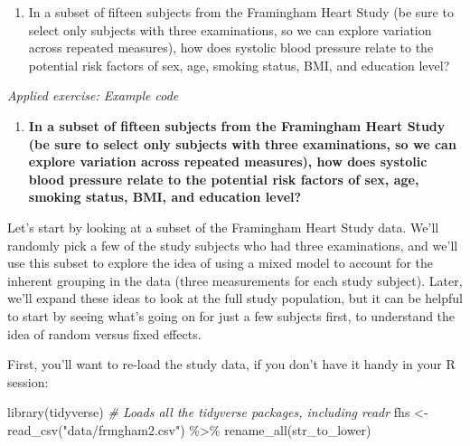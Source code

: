 \documentclass[
]{book}
\newenvironment{Shaded}{\begin{snugshade}}{\end{snugshade}}
\newcommand{\CommentTok}[1]{\textcolor[rgb]{0.56,0.35,0.01}{\textit{#1}}}
\newcommand{\FunctionTok}[1]{\textcolor[rgb]{0.00,0.00,0.00}{#1}}
\newcommand{\NormalTok}[1]{#1}
\newcommand{\OtherTok}[1]{\textcolor[rgb]{0.56,0.35,0.01}{#1}}
\newcommand{\SpecialCharTok}[1]{\textcolor[rgb]{0.00,0.00,0.00}{#1}}
\newcommand{\StringTok}[1]{\textcolor[rgb]{0.31,0.60,0.02}{#1}}
\providecommand{\tightlist}{%
  \setlength{\itemsep}{0pt}\setlength{\parskip}{0pt}}
\begin{document}
\begin{enumerate}
\def\labelenumi{\arabic{enumi}.}
\tightlist
\item
  In a subset of fifteen subjects from the Framingham Heart Study (be sure
  to select only subjects with three examinations, so we can explore variation
  across repeated measures), how does systolic blood pressure relate to the
  potential risk factors of sex, age, smoking status, BMI, and education level?
\end{enumerate}

\emph{Applied exercise: Example code}

\begin{enumerate}
\def\labelenumi{\arabic{enumi}.}
\tightlist
\item
  \textbf{In a subset of fifteen subjects from the Framingham Heart Study (be sure
  to select only subjects with three examinations, so we can explore variation
  across repeated measures), how does systolic blood pressure relate to the
  potential risk factors of sex, age, smoking status, BMI, and education level?}
\end{enumerate}

Let's start by looking at a subset of the Framingham Heart Study data. We'll
randomly pick a few of the study subjects who had three examinations, and
we'll use this subset to explore the idea of using a mixed model to account
for the inherent grouping in the data (three measurements for each study
subject). Later, we'll expand these ideas to look at the full study population,
but it can be helpful to start by seeing what's going on for just a few subjects
first, to understand the idea of random versus fixed effects.

First, you'll want to re-load the study data, if you don't have it handy in
your R session:

\begin{Shaded}
\begin{Highlighting}[]
\FunctionTok{library}\NormalTok{(tidyverse) }\CommentTok{\# Loads all the tidyverse packages, including readr}
\NormalTok{fhs }\OtherTok{\textless{}{-}} \FunctionTok{read\_csv}\NormalTok{(}\StringTok{"data/frmgham2.csv"}\NormalTok{) }\SpecialCharTok{\%\textgreater{}\%} 
  \FunctionTok{rename\_all}\NormalTok{(str\_to\_lower)}
\end{Highlighting}
\end{Shaded}
\end{document}
